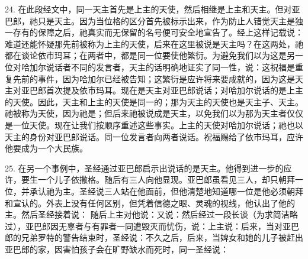 24. 在此段经文中，同一天主首先是上主的天使，然后相继是上主和天主。但对亚巴郎，祂只是天主。因为当位格的区分首先被标示出来，作为防止人错觉天主是独一存有的保障之后，祂真实而无保留的名号便可安全地宣告了。经上这样记载说：  难道还能怀疑那先前被称为上主的天使，后来在这里被说是天主吗？在这两处，祂都在谈论依市玛耳；在两者中，都是同一位要使他繁衍。为避免我们以为这是另一位对哈加尔说话者不同的发言者，天主的话明确地证实了同一性，说：这祝福是重复先前的事件，因为哈加尔已经被告知；这繁衍是应许将来要成就的，因为这是天主对亚巴郎首次提及依市玛耳。现在是天主对亚巴郎说话；对哈加尔说话的是上主的天使。因此，天主和上主的天使是同一的；那为天主的天使也是天主子、天主。祂被称为天使，因为祂是；但后来祂被说成是天主，以免我们以为那为天主者仅仅是一位天使。现在让我们按顺序重述这些事实。上主的天使对哈加尔说话；祂也以天主的身份对亚巴郎说话。同一位发言者向两者说话。祝福赐给了依市玛耳，应许他要成为一个大民族。\par

25. 在另一个事例中，圣经通过亚巴郎启示出说话的是天主。他得到进一步的应许，要生一个儿子依撒格。随后有三人向他显现。亚巴郎虽看见三人，却只朝拜一位，并承认祂为主。圣经说三人站在他面前，但他清楚地知道哪一位是他必须朝拜和宣认的。外表上没有任何区别，但凭着信德之眼、灵魂的视线，他认出了他的主。然后圣经接着说：  随后上主对他说：又说：然后经过一段长谈（为求简洁略过），亚巴郎因无辜者与有罪者一同遭毁灭而忧伤，说：上主说：后来，当对亚巴郎的兄弟罗特的警告结束时，圣经说：不久之后，后来，当婢女和她的儿子被赶出亚巴郎的家，因害怕孩子会在旷野缺水而死时，同一圣经说：\par

